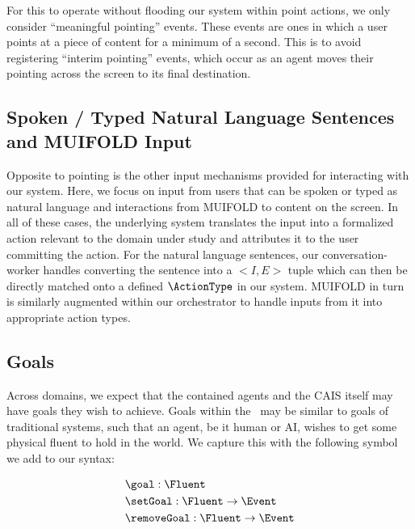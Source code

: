 For this to operate without flooding our system within point actions, we only consider
``meaningful pointing'' events. These events are ones in which a user points at a piece
of content for a minimum of a second. This is to avoid registering ``interim pointing''
events, which occur as an agent moves their pointing across the screen to its final
destination.

\subsection{Spoken / Typed Natural Language Sentences and MUIFOLD Input}

Opposite to pointing is the other input mechanisms provided for interacting with our system.
Here, we focus on input from users that can be spoken or typed as natural language and
interactions from MUIFOLD to content on the screen. In all of these cases, the underlying
system translates the input into a formalized action relevant to the domain under study
and attributes it to the user committing the action. For the natural language sentences,
our conversation-worker handles converting the sentence into a $<I, E>$ tuple which
can then be directly matched onto a defined $\ActionType$ in our system. MUIFOLD in turn is
similarly augmented within our orchestrator to handle inputs from it into appropriate action
types.

\subsection{Goals}

Across domains, we expect that the contained agents and the CAIS itself may have goals they
wish to achieve. Goals within the \CEC\ may be similar to goals of traditional systems, such
that an agent, be it human or AI, wishes to get some physical fluent to hold in the world.
We capture this with the following symbol we add to our syntax:

\begin{equation*}
    \begin{aligned}
    & \goal: \Fluent \\
    & \setGoal: \Fluent \rightarrow \Event \\
    & \removeGoal: \Fluent \rightarrow \Event \\
    \end{aligned}
\end{equation*}